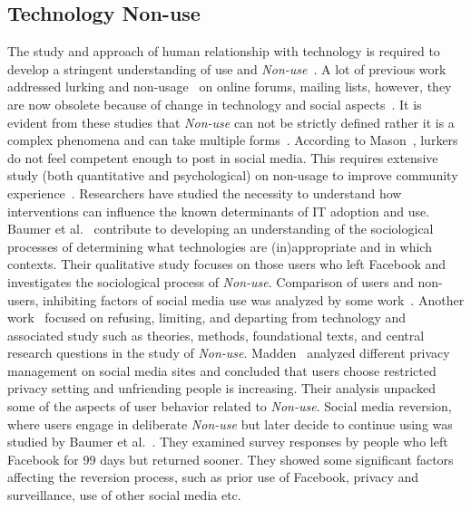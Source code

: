 \subsection{Technology Non-use}
The study and approach of human relationship with technology is required to develop a stringent understanding of use and \emph{Non-use}~\cite{ baumer2015study}. A lot of previous work addressed lurking and non-usage~\cite{ames2013managing, crawford2009following, portwood2013media} on online forums, mailing lists, however, they are now obsolete because of change in technology and social aspects~\cite{nonnecke2001lurkers}. It is evident from these studies that \emph{Non-use} can not be strictly defined rather it is a complex phenomena and can take multiple forms~\cite{baumer2015importance}. According to Mason~\cite{mason1999issues}, lurkers do not feel competent enough to post in social media. This requires extensive study (both quantitative and psychological) on non-usage to improve community experience~\cite{preece2004top, schultz2004lurkers}.  Researchers have studied the necessity to understand how interventions can influence the known determinants of IT adoption and use. Baumer et al.~\cite{baumer2013limiting} contribute to developing an understanding of the sociological processes of determining what technologies are
(in)appropriate and in which contexts. Their qualitative study focuses on those users who left Facebook and investigates the sociological process of \textit{Non-use}. Comparison of users and non-users, inhibiting factors of social media use was analyzed by some work~\cite{hargittai2007whose, ryan2011uses,warschauer2004technology}. Another work~\cite{baumer2014refusing} focused on refusing, limiting, and departing from technology and associated study such as theories, methods, foundational texts, and central research questions in the study of \textit{Non-use}. Madden~\cite{madden2012privacy} analyzed different privacy management on social media sites and concluded that users choose restricted privacy setting and unfriending people is increasing. Their analysis unpacked some of the aspects of user behavior related to \textit{Non-use}. Social media reversion, where users engage in deliberate \emph{Non-use} but later decide to continue using was studied by Baumer et al.~\cite{baumer2015missing}. They examined survey responses by people who left Facebook for 99 days but returned sooner. They showed some significant factors affecting the reversion process, such as prior use of Facebook, privacy and surveillance, use of other social media etc. 

